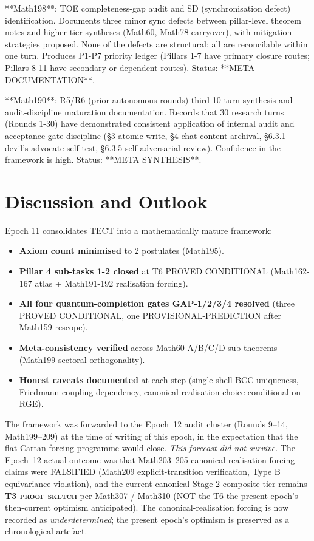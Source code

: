 **Math198**: TOE completeness-gap audit and SD (synchronisation defect) identification.
Documents three minor sync defects between pillar-level theorem notes and higher-tier
syntheses (Math60, Math78 carryover), with mitigation strategies proposed. None of
the defects are structural; all are reconcilable within one turn. Produces P1-P7 priority
ledger (Pillars 1-7 have primary closure routes; Pillars 8-11 have secondary or dependent
routes). Status: **META DOCUMENTATION**.

**Math190**: R5/R6 (prior autonomous rounds) third-10-turn synthesis and audit-discipline
maturation documentation. Records that 30 research turns (Rounds 1-30) have
demonstrated consistent application of internal audit and acceptance-gate discipline
(§3 atomic-write, §4 chat-content archival, §6.3.1 devil's-advocate self-test, §6.3.5
self-adversarial review). Confidence in the framework is high. Status: **META
SYNTHESIS**.

\section{Discussion and Outlook}
Epoch 11 consolidates TECT into a mathematically mature framework:

\begin{itemize}
\item \textbf{Axiom count minimised} to 2 postulates (Math195).
\item \textbf{Pillar 4 sub-tasks 1-2 closed} at T6 PROVED CONDITIONAL (Math162-167 atlas +
  Math191-192 realisation forcing).
\item \textbf{All four quantum-completion gates GAP-1/2/3/4 resolved} (three PROVED CONDITIONAL,
  one PROVISIONAL-PREDICTION after Math159 rescope).
\item \textbf{Meta-consistency verified} across Math60-A/B/C/D sub-theorems (Math199 sectoral
  orthogonality).
\item \textbf{Honest caveats documented} at each step (single-shell BCC uniqueness, Friedmann-coupling
  dependency, canonical realisation choice conditional on RGE).
\end{itemize}

The framework was forwarded to the Epoch~12 audit cluster (Rounds
9--14, Math199--209) at the time of writing of this epoch, in the
expectation that the flat-Cartan forcing programme would close.
\emph{This forecast did not survive.} The Epoch~12 actual outcome
was that Math203--205 canonical-realisation forcing claims were
FALSIFIED (Math209 explicit-transition verification, Type B
equivariance violation), and the current canonical Stage-2 composite
tier remains \textbf{T3 \textsc{proof sketch}} per Math307 / Math310
(NOT the T6 the present epoch's then-current optimism anticipated).
The canonical-realisation forcing is now recorded as
\emph{underdetermined}; the present epoch's optimism is preserved
as a chronological artefact.


